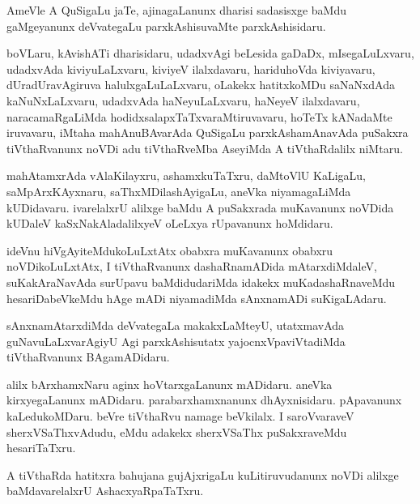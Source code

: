 \documentclass{article}
\begin{document}
\begin{mn}
AmeVle  A QuSigaLu  jaTe,  ajinagaLanunx  dharisi  sadasisxge  baMdu  gaMgeyanunx  
deVvategaLu  parxkAshisuvaMte  parxkAshisidaru.  
\end{mn}

\begin{mn}
boVLaru,  kAvishATi  dharisidaru,  udadxvAgi  beLesida  gaDaDx,  mIsegaLuLxvaru,  udadxvAda  
kiviyuLaLxvaru,  kiviyeV  ilalxdavaru,  hariduhoVda  kiviyavaru,  dUradUravAgiruva  
halulxgaLuLaLxvaru,  oLakekx  hatitxkoMDu  saNaNxdAda  kaNuNxLaLxvaru,  udadxvAda  
haNeyuLaLxvaru,  haNeyeV  ilalxdavaru,  naracamaRgaLiMda  hodidxsalapxTaTxvaraMtiruvavaru,  
hoTeTx kANadaMte  iruvavaru,  iMtaha  mahAnuBAvarAda  QuSigaLu  parxkAshamAnavAda  
puSakxra  tiVthaRvanunx  noVDi  adu  tiVthaRveMba  AseyiMda  A  tiVthaRdalilx  niMtaru. 
\end{mn}

\begin{mn}
mahAtamxrAda  vAlaKilayxru,  ashamxkuTaTxru,  daMtoVlU KaLigaLu, saMpArxKAyxnaru,  saThxMDilashAyigaLu,  
aneVka  niyamagaLiMda  kUDidavaru.  ivarelalxrU  alilxge  baMdu  A puSakxrada  muKavanunx  noVDida  
kUDaleV  kaSxNakAladalilxyeV  oLeLxya  rUpavanunx  hoMdidaru.
\end{mn}

\begin{mn}
ideVnu  hiVgAyiteMdukoLuLxtAtx  obabxra  muKavanunx  obabxru noVDikoLuLxtAtx, I  tiVthaRvanunx  
dashaRnamADida  mAtarxdiMdaleV,  suKakAraNavAda  surUpavu  baMdidudariMda  idakekx  
muKadashaRnaveMdu  hesariDabeVkeMdu  hAge  mADi  niyamadiMda  sAnxnamADi  suKigaLAdaru.
\end{mn}

\begin{mn}
sAnxnamAtarxdiMda  deVvategaLa  makakxLaMteyU,  utatxmavAda  guNavuLaLxvarAgiyU  Agi  
parxkAshisutatx  yajocnxVpaviVtadiMda  tiVthaRvanunx  BAgamADidaru.
\end{mn}

\begin{mn}
alilx  bArxhamxNaru  aginx hoVtarxgaLanunx  mADidaru.  aneVka kirxyegaLanunx  mADidaru.  
parabarxhamxnanunx  dhAyxnisidaru.  pApavanunx kaLedukoMDaru.  beVre  tiVthaRvu namage  beVkilalx.  
I  saroVvaraveV  sherxVSaThxvAdudu,  eMdu  adakekx  sherxVSaThx puSakxraveMdu  hesariTaTxru. 
\end{mn}

\begin{mn}
A tiVthaRda  hatitxra  bahujana  gujAjxrigaLu  kuLitiruvudanunx  noVDi  alilxge  
baMdavarelalxrU  AshacxyaRpaTaTxru. 
\end{mn}
\end{document}
